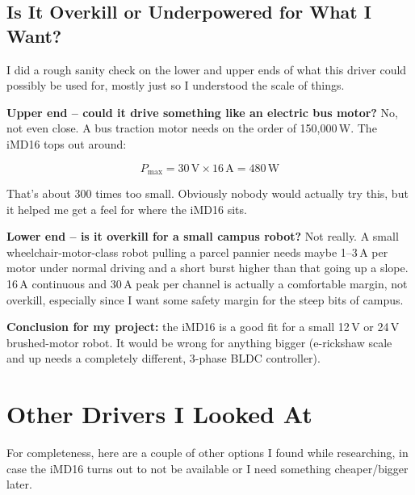 \documentclass[12pt,a4paper]{article}
\begin{document}
\subsection{Is It Overkill or Underpowered for What I Want?}

I did a rough sanity check on the lower and upper ends of what this driver could possibly
be used for, mostly just so I understood the scale of things.

\textbf{Upper end -- could it drive something like an electric bus motor?} No, not even
close. A bus traction motor needs on the order of 150,000\,W. The iMD16 tops out around:

\begin{equation}
    P_\text{max} = 30\,\text{V} \times 16\,\text{A} = 480\,\text{W}
\end{equation}

That's about 300 times too small. Obviously nobody would actually try this, but it helped
me get a feel for where the iMD16 sits.

\textbf{Lower end -- is it overkill for a small campus robot?} Not really. A small
wheelchair-motor-class robot pulling a parcel pannier needs maybe 1--3\,A per motor
under normal driving and a short burst higher than that going up a slope. 16\,A continuous
and 30\,A peak per channel is actually a comfortable margin, not overkill, especially
since I want some safety margin for the steep bits of campus.

\textbf{Conclusion for my project:} the iMD16 is a good fit for a small 12\,V or 24\,V
brushed-motor robot. It would be wrong for anything bigger (e-rickshaw scale and up needs
a completely different, 3-phase BLDC controller).

\section{Other Drivers I Looked At}

For completeness, here are a couple of other options I found while researching, in case
the iMD16 turns out to not be available or I need something cheaper/bigger later.
\end{document}
